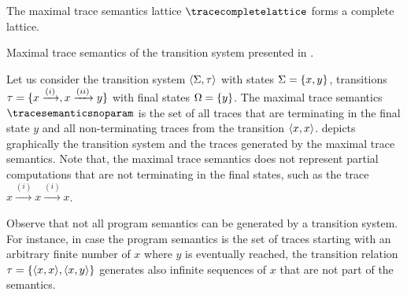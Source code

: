 The maximal trace semantics lattice $\tracecompletelattice$ forms a complete lattice.

\begin{marginfigure}
  \centering
{}
\caption{Maximal trace semantics of the transition system presented in .}
\end{marginfigure}

\begin{example}
  Let us consider the transition system $\langle \Sigma, \tau \rangle$ with states $\Sigma = \{x, y\}$, transitions $\tau = \{x \xrightarrow{(i)}, x \xrightarrow{(ii)} y\}$ with final states $\Omega = \{y\}$. The maximal trace semantics $\tracesemanticsnoparam$ is the set of all traces that are terminating in the final state $y$ and all non-terminating traces from the transition $\langle x, x \rangle$.
   depicts graphically the transition system and the traces generated by the maximal trace semantics.
  Note that, the maximal trace semantics does not represent partial computations that are not terminating in the final states, such as the trace $x \xrightarrow{(i)} x \xrightarrow{(i)} x$.
\end{example}

\begin{remark}
  Observe that not all program semantics can be generated by a transition system.
  For instance, in case the program semantics is the set of traces starting with an arbitrary finite number of $x$ where $y$ is eventually reached, the transition relation $\tau = \{\langle x, x \rangle, \langle x, y \rangle\}$ generates also infinite sequences of $x$ that are not part of the semantics.
\end{remark}

